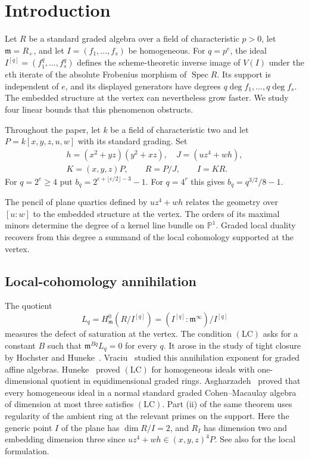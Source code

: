 \documentclass[11pt,a4paper,reqno]{amsart}
\numberwithin{equation}{section}
\theoremstyle{plain}
\theoremstyle{definition}
\theoremstyle{remark}
\newcommand{\mm}{\mathfrak m}
\DeclareMathOperator{\Spec}{Spec}
\begin{document}

\section{Introduction}

Let $R$ be a standard graded algebra over a field of characteristic
$p>0$, let $\mm=R_+$, and let $I=(f_1,\ldots,f_s)$ be homogeneous.
For $q=p^e$, the ideal $I^{[q]}=(f_1^q,\ldots,f_s^q)$ defines the
scheme-theoretic inverse image of $V(I)$ under the $e$th iterate of
the absolute Frobenius morphism of $\Spec R$. Its support is independent
of $e$, and its displayed generators have degrees $q\deg f_1,\ldots,q\deg f_s$.
The embedded structure at
the vertex can nevertheless grow faster. We study four linear bounds
that this phenomenon obstructs.

Throughout the paper, let $k$ be a field of characteristic two and let
$P=k[x,y,z,u,w]$ with its standard grading. Set
\begin{equation}\label{eq:fixed-pair}
\begin{gathered}
 h=(x^2+yz)(y^2+xz),\quad J=(uz^4+wh),\\
 K=(x,y,z)P,\qquad R=P/J,\qquad I=KR .
\end{gathered}
\end{equation}
For $q=2^e\geq4$ put $b_q=2^{e+\lfloor e/2\rfloor-3}-1$.
For $q=4^r$ this gives $b_q=q^{3/2}/8-1$.

The pencil of plane quartics defined by $uz^4+wh$ relates the geometry
over $[u:w]$ to the embedded structure at the vertex. The orders of its
maximal minors determine the degree of a kernel line bundle on
$\mathbb P^1$. Graded local duality recovers from this degree a summand
of the local cohomology supported at the vertex.

\subsection*{Local-cohomology annihilation}
The quotient
\[
 L_q=H^0_{\mm}(R/I^{[q]})
     =(I^{[q]}:\mm^\infty)/I^{[q]}
\]
measures the defect of saturation at the vertex. The condition
$(\mathrm{LC})$ asks for a constant $B$ such that
$\mm^{Bq}L_q=0$ for every $q$. It arose in the study of tight closure
by Hochster and Huneke~\cite[discussion after Proposition 4.16]{HH}.
Vraciu~\cite{Vraciu} studied this annihilation exponent for graded
affine algebras. Huneke~\cite[Corollary 3.2]{HunekeLC} proved
$(\mathrm{LC})$ for homogeneous ideals with one-dimensional quotient
in equidimensional graded rings. Asgharzadeh~\cite[Theorem 1.2(i)]{Asgharzadeh}
proved that every homogeneous ideal in a normal standard graded
Cohen--Macaulay algebra of dimension at most three satisfies
$(\mathrm{LC})$.
Part (ii) of the same theorem uses regularity of the ambient ring at the
relevant primes on the support. Here the generic point $I$ of the plane
has $\dim R/I=2$, and $R_I$ has dimension two and embedding dimension
three since $uz^4+wh\in(x,y,z)^4P$. See also \cite[Conjecture 3.1]{PQ} for the local formulation.
\end{document}

